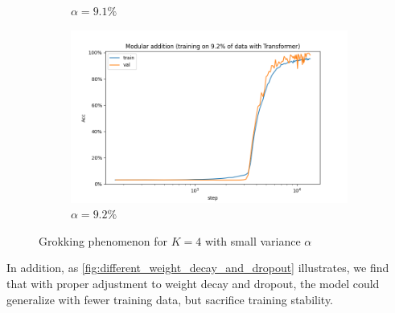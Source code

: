 \begin{figure}[!ht]
\begin{subfigure}{0.3\textwidth}
		\caption{$\alpha=9.1\%$}
		\label{fig:alpha=9.1}
	\end{subfigure}
	\begin{subfigure}{0.3\textwidth}
		\centering
		\includegraphics[width=\linewidth]{fig/Transformer_p=31/K=4/dropout=0.1,wd=0.1/alpha=9.2_dropout=0.1_wd=0.1/addition_9.2_Transformer_step.png}
		\caption{$\alpha=9.2\%$}
		\label{fig:alpha=9.2}
	\end{subfigure}
	\caption{Grokking phenomenon for $K=4$ with small variance $\alpha$}
	\label{fig:K=4}
\end{figure}

In addition, as \cref{fig:different_weight_decay_and_dropout} illustrates, we find that with proper adjustment to weight decay and dropout, the model could generalize with fewer training data, but sacrifice training stability.


